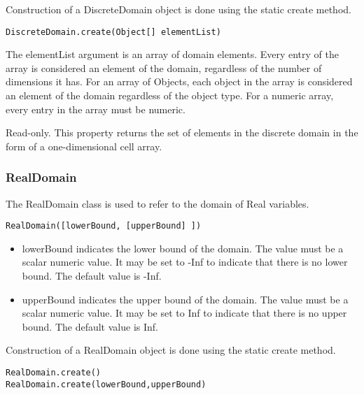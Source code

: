\ifjava
Construction of a DiscreteDomain object is done using the static create method.

\begin{lstlisting}
DiscreteDomain.create(Object[] elementList)
\end{lstlisting}

The elementList argument is an array of domain elements.  Every entry of the array is considered an element of the domain, regardless of the number of dimensions it has.  For an array of Objects, each object in the array is considered an element of the domain regardless of the object type.  For a numeric array, every entry in the array must be numeric.
\fi



Read-only.  This property returns the set of elements in the discrete domain in the form of a one-dimensional \ifmatlab cell \fi array.



\subsubsection{RealDomain}
\label{sec:RealDomain}

The RealDomain class is used to refer to the domain of Real variables.


\ifmatlab
\begin{lstlisting}
RealDomain([lowerBound, [upperBound] ])
\end{lstlisting}

\begin{itemize}
\item lowerBound indicates the lower bound of the domain.  The value must be a scalar numeric value.  It may be set to -Inf to indicate that there is no lower bound.  The default value is -Inf.
\item upperBound indicates the upper bound of the domain.  The value must be a scalar numeric value.  It may be set to Inf to indicate that there is no upper bound.  The default value is Inf.
\end{itemize}

\fi

\ifjava
Construction of a RealDomain object is done using the static create method.

\begin{lstlisting}
RealDomain.create()
RealDomain.create(lowerBound,upperBound)
\end{lstlisting}

